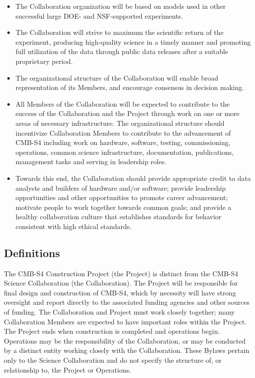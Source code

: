 \documentclass[12pt]{article}
\begin{document}
\begin{itemize}
\item The Collaboration organization will be based on models used in other successful  large DOE- and NSF-supported experiments.  %

\item The Collaboration will strive to maximum the scientific return of the experiment, producing high-quality science in a timely manner and promoting full utilization of the data through public data releases after a suitable proprietary period.

\item The organizational structure of the Collaboration will enable broad representation of its Members, and encourage consensus in decision making. %

\item   All Members of the Collaboration will be expected to contribute to the success of the Collaboration and the Project through work on one or more areas of necessary infrastructure. The organizational structure should incentivize Collaboration Members to contribute to the advancement of CMB-S4 including work on hardware, software, testing, commissioning, operations, common science infrastructure, documentation,  publications,  management tasks and serving in leadership roles.


\item Towards this end, the Collaboration should provide appropriate credit to data analysts and builders of hardware and/or software; provide leadership opportunities and other opportunities to promote career advancement; motivate people to work together towards common goals; %
and provide a healthy collaboration culture that establishes standards for behavior consistent with high ethical standards.

\end{itemize}


\subsection{Definitions}

The CMB-S4 Construction Project (the Project) is distinct from the CMB-S4 Science Collaboration (the Collaboration). The Project will be responsible for final design and construction of CMB-S4, which by necessity will have strong oversight and  report directly to the associated funding agencies and other sources of funding.  The Collaboration and Project must work closely together; many Collaboration Members are expected to have important roles within the Project. The Project ends when construction is completed and operations begin. Operations may be the responsibility of the Collaboration, or may be conducted by a distinct entity working closely with the Collaboration. These Bylaws pertain only to the Science Collaboration and do not specify the structure of, or relationship to, the Project or Operations. 
\vskip 12pt
\end{document}
